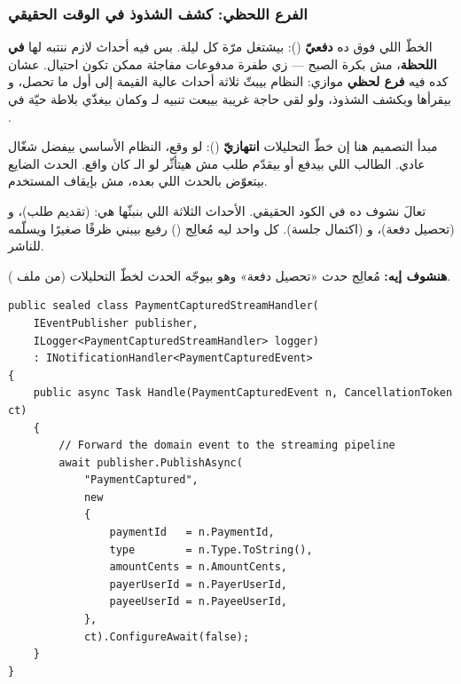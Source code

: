 \subsubsection{الفرع اللحظي: كشف الشذوذ في الوقت الحقيقي}

الخطّ اللي فوق ده \textbf{دفعيّ} (): بيشتغل مرّة كل ليلة. بس فيه أحداث
لازم ننتبه لها \textbf{في اللحظة}، مش بكرة الصبح — زي طفرة مدفوعات مفاجئة ممكن
تكون احتيال. عشان كده فيه \textbf{فرع لحظي} موازي: النظام بيبثّ ثلاثة أحداث
عالية القيمة إلى  أول ما تحصل، و
بيقرأها ويكشف الشذوذ، ولو لقى حاجة غريبة بيبعت تنبيه لـ وكمان
بيغذّي بلاطة حيّة في .

\begin{keyp}
مبدأ التصميم هنا إن خطّ التحليلات \textbf{انتهازيّ} (): لو
وقع، النظام الأساسي بيفضل شغّال عادي. الطالب اللي بيدفع أو بيقدّم طلب مش هيتأثّر
لو الـ كان واقع. الحدث الضايع بيتعوّض بالحدث اللي بعده، مش بإيقاف
المستخدم.
\end{keyp}

تعالَ نشوف ده في الكود الحقيقي. الأحداث الثلاثة اللي بنبثّها هي:
 (تقديم طلب)، و (تحصيل دفعة)،
و (اكتمال جلسة). كل واحد ليه مُعالِج
() رفيع بيبني ظرفًا صغيرًا ويسلّمه للناشر.

\textbf{هنشوف إيه:} مُعالِج حدث «تحصيل دفعة» وهو بيوجّه الحدث لخطّ التحليلات
(من ملف ).

\begin{english}
\begin{lstlisting}[language={[Sharp]C}]
public sealed class PaymentCapturedStreamHandler(
    IEventPublisher publisher,
    ILogger<PaymentCapturedStreamHandler> logger)
    : INotificationHandler<PaymentCapturedEvent>
{
    public async Task Handle(PaymentCapturedEvent n, CancellationToken ct)
    {
        // Forward the domain event to the streaming pipeline
        await publisher.PublishAsync(
            "PaymentCaptured",
            new
            {
                paymentId   = n.PaymentId,
                type        = n.Type.ToString(),
                amountCents = n.AmountCents,
                payerUserId = n.PayerUserId,
                payeeUserId = n.PayeeUserId,
            },
            ct).ConfigureAwait(false);
    }
}
\end{lstlisting}
\end{english}

